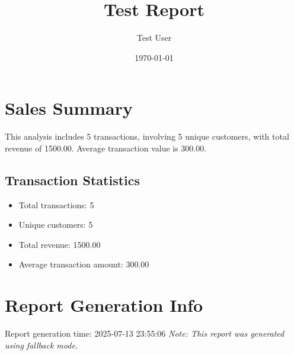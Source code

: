 \documentclass{article}
\title{Test Report}
\author{Test User}
\date{\today}
\begin{document}
\maketitle

\section{Sales Summary}
This analysis includes 5 transactions,
involving 5 unique customers,
with total revenue of 1500.00.
Average transaction value is 300.00.

\subsection{Transaction Statistics}
\begin{itemize}
\item Total transactions: 5
\item Unique customers: 5
\item Total revenue: 1500.00
\item Average transaction amount: 300.00
\end{itemize}

\section{Report Generation Info}
Report generation time: 2025-07-13 23:55:06
\textit{Note: This report was generated using fallback mode.}
\end{document}
